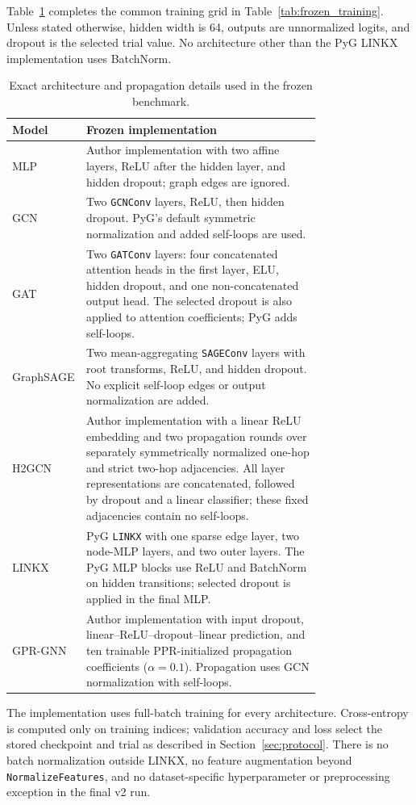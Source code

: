 Table~\ref{tab:architecture_details} completes the common training grid in Table~\ref{tab:frozen_training}. Unless stated otherwise, hidden width is 64, outputs are unnormalized logits, and dropout is the selected trial value. No architecture other than the PyG LINKX implementation uses BatchNorm.

\begin{table}[ht]
\centering
\caption{Exact architecture and propagation details used in the frozen benchmark.}
\label{tab:architecture_details}
\small
\begin{tabular}{@{}lp{0.76\linewidth}@{}}
\toprule
Model & Frozen implementation \\
\midrule
MLP & Author implementation with two affine layers, ReLU after the hidden layer, and hidden dropout; graph edges are ignored. \\
GCN & Two \texttt{GCNConv} layers, ReLU, then hidden dropout. PyG's default symmetric normalization and added self-loops are used. \\
GAT & Two \texttt{GATConv} layers: four concatenated attention heads in the first layer, ELU, hidden dropout, and one non-concatenated output head. The selected dropout is also applied to attention coefficients; PyG adds self-loops. \\
GraphSAGE & Two mean-aggregating \texttt{SAGEConv} layers with root transforms, ReLU, and hidden dropout. No explicit self-loop edges or output normalization are added. \\
H2GCN & Author implementation with a linear ReLU embedding and two propagation rounds over separately symmetrically normalized one-hop and strict two-hop adjacencies. All layer representations are concatenated, followed by dropout and a linear classifier; these fixed adjacencies contain no self-loops. \\
LINKX & PyG \texttt{LINKX} with one sparse edge layer, two node-MLP layers, and two outer layers. The PyG MLP blocks use ReLU and BatchNorm on hidden transitions; selected dropout is applied in the final MLP. \\
GPR-GNN & Author implementation with input dropout, linear--ReLU--dropout--linear prediction, and ten trainable PPR-initialized propagation coefficients ($\alpha=0.1$). Propagation uses GCN normalization with self-loops. \\
\bottomrule
\end{tabular}
\end{table}

The implementation uses full-batch training for every architecture. Cross-entropy is computed only on training indices; validation accuracy and loss select the stored checkpoint and trial as described in Section~\ref{sec:protocol}. There is no batch normalization outside LINKX, no feature augmentation beyond \texttt{NormalizeFeatures}, and no dataset-specific hyperparameter or preprocessing exception in the final v2 run.
